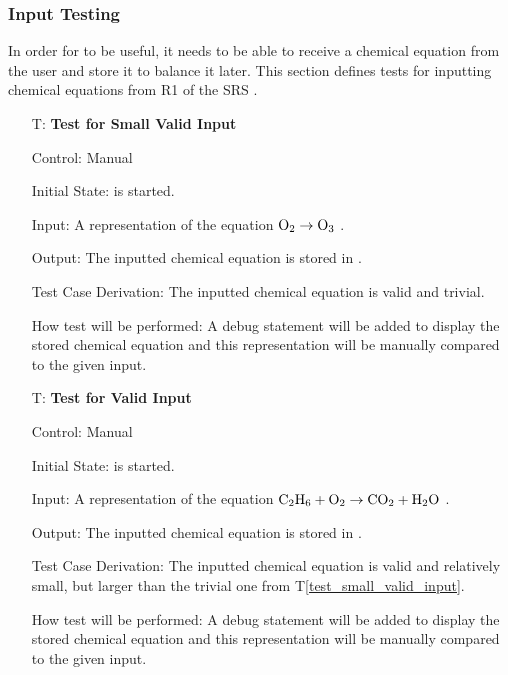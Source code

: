\documentclass[12pt, titlepage]{article}
\newcounter{testnum} %
\newcommand{\testref}[1]{T\ref{#1}}
\begin{document}
\subsubsection{Input Testing}

In order for \progname{} to be useful, it needs to be able to receive a
chemical equation from the user and store it to balance it later. This
section defines tests for inputting chemical equations from R1 of the SRS
. 

\begin{enumerate}

  \item[T\refstepcounter{testnum}\thetestnum \label{test_small_valid_input}:]
    \textbf{Test for Small Valid Input}

    Control: Manual

    Initial State: \progname{} is started.

    Input: A representation of the equation $\ce{O2} \rightarrow \ce{O3}$
    \cite{fahey_twenty_2011}.

    Output: The inputted chemical equation is stored in \progname{}.

    Test Case Derivation: The inputted chemical equation is
    valid and trivial.

    How test will be performed: A debug statement will be added to display the
    stored chemical equation and this representation will be manually compared to
    the given input.

  \item[T\refstepcounter{testnum}\thetestnum \label{test_valid_input}:]
    \textbf{Test for Valid Input}

    Control: Manual

    Initial State: \progname{} is started.

    Input: A representation of the equation
    $\ce{C2H6} + \ce{O2} \rightarrow \ce{CO2} + \ce{H2O}$
    \cite{hamid_balancing_2019}.

    Output: The inputted chemical equation is stored in \progname{}.

    Test Case Derivation: The inputted chemical equation is valid and
    relatively small, but larger than the trivial one from
    \testref{test_small_valid_input}.

    How test will be performed: A debug statement will be added to display the
    stored chemical equation and this representation will be manually compared to
    the given input.


\end{enumerate}
\end{document}
